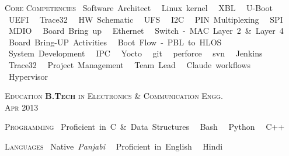 \documentclass[10pt, a4paper]{article}
\newcommand{\MainHeading}[1]{%
    {\noindent \color{ltgrey}\normalsize{\textsc {#1}}}\vspace{2pt}}%
\newcommand{\MainSubHeading}[2]{%
   {\noindent \large{\textsc{\textbf{#1} #2}}}\\ }
\newcommand{\bpoint}[1]{\mbox{{\textbullet{} #1 }}}
\begin{document}
\begin{minipage}[t]{0.33\textwidth}        %
\raggedright{
   \MainHeading{Core Competencies}\newline%
   {
      \bpoint{Software Architect}
      \bpoint{Linux kernel}
      \bpoint{XBL}
      \bpoint{U-Boot}
      \bpoint{UEFI}
      \bpoint{Trace32}
      \bpoint{HW Schematic}
      \bpoint{UFS}
      \bpoint{I2C}
      \bpoint{PIN Multiplexing}
      \bpoint{SPI}
      \bpoint{MDIO}
      \bpoint{Board Bring up}
      \bpoint{Ethernet}
      \bpoint{Switch - MAC Layer 2 \& Layer 4}
      \bpoint{Board Bring-UP Activities}
      \bpoint{Boot Flow - PBL to HLOS}
      \bpoint{System Development}
      \bpoint{IPC}
      \bpoint{Yocto}
      \bpoint{git} \bpoint{perforce} \bpoint{svn} \bpoint{Jenkins} \bpoint{Trace32}
      \bpoint{Project Management}
      \bpoint{Team Lead}
      \bpoint{Claude workflows}
      \bpoint{Hypervisor}
   }
} %
\newline %

   \MainHeading{Education}\newline%
   \MainSubHeading{B.Tech}{in Electronics \& Communication Engg.}
   {\textsc {\small \color{ltgrey}\UserCollege{} \hfill Apr 2013}}
\newline %

   \MainHeading{Programming}\newline%
   \bpoint{Proficient in C \& Data Structures}
   \bpoint{Bash}
   \bpoint{Python}
   \bpoint{C++}
\newline %


   \MainHeading{Languages}\newline%
   \bpoint{Native \emph{Panjabi}}
   \bpoint{Proficient in English}
   \bpoint{Hindi}
\end{minipage}%
%
\hfill
%
\end{document}
